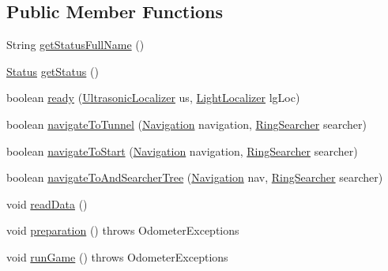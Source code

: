 \subsection*{Public Member Functions}
\begin{DoxyCompactItemize}
\item 
String \hyperlink{enumca_1_1mcgill_1_1ecse211_1_1project_1_1_game_a43a5763d183e0bcacd402c872c07273e}{get\+Status\+Full\+Name} ()
\item 
\hyperlink{enumca_1_1mcgill_1_1ecse211_1_1project_1_1_game_1_1_status}{Status} \hyperlink{enumca_1_1mcgill_1_1ecse211_1_1project_1_1_game_a620374b3eeb3dd7e0abd26f3ced9053b}{get\+Status} ()
\item 
boolean \hyperlink{enumca_1_1mcgill_1_1ecse211_1_1project_1_1_game_a5b304a6a59ddee3f8c7d37bba8a4c129}{ready} (\hyperlink{classca_1_1mcgill_1_1ecse211_1_1localization_1_1_ultrasonic_localizer}{Ultrasonic\+Localizer} us, \hyperlink{classca_1_1mcgill_1_1ecse211_1_1localization_1_1_light_localizer}{Light\+Localizer} lg\+Loc)
\item 
boolean \hyperlink{enumca_1_1mcgill_1_1ecse211_1_1project_1_1_game_ad3d03cffa33c927317d8fcba0c928a24}{navigate\+To\+Tunnel} (\hyperlink{classca_1_1mcgill_1_1ecse211_1_1project_1_1_navigation}{Navigation} navigation, \hyperlink{classca_1_1mcgill_1_1ecse211_1_1project_1_1_ring_searcher}{Ring\+Searcher} searcher)
\item 
boolean \hyperlink{enumca_1_1mcgill_1_1ecse211_1_1project_1_1_game_aa9d873f6cd4ef177c1622c24f72b0e0a}{navigate\+To\+Start} (\hyperlink{classca_1_1mcgill_1_1ecse211_1_1project_1_1_navigation}{Navigation} navigation, \hyperlink{classca_1_1mcgill_1_1ecse211_1_1project_1_1_ring_searcher}{Ring\+Searcher} searcher)
\item 
boolean \hyperlink{enumca_1_1mcgill_1_1ecse211_1_1project_1_1_game_a623ef585f41a45d778590392314ea352}{navigate\+To\+And\+Searcher\+Tree} (\hyperlink{classca_1_1mcgill_1_1ecse211_1_1project_1_1_navigation}{Navigation} nav, \hyperlink{classca_1_1mcgill_1_1ecse211_1_1project_1_1_ring_searcher}{Ring\+Searcher} searcher)
\item 
void \hyperlink{enumca_1_1mcgill_1_1ecse211_1_1project_1_1_game_a032b53e9b16b9d470b461de4a311a698}{read\+Data} ()
\item 
void \hyperlink{enumca_1_1mcgill_1_1ecse211_1_1project_1_1_game_a8f3c5b18f98ee56f5f03afd72fa40bcb}{preparation} ()  throws Odometer\+Exceptions 
\item 
void \hyperlink{enumca_1_1mcgill_1_1ecse211_1_1project_1_1_game_adf69abe44e952d627fb9e6a2f678cb5e}{run\+Game} ()  throws Odometer\+Exceptions 
\end{DoxyCompactItemize}
